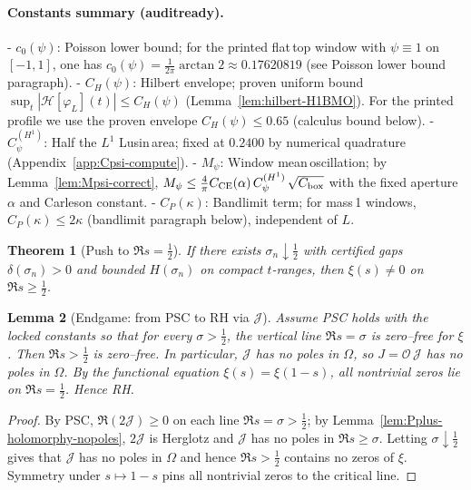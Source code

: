 \documentclass[11pt]{article}
\newtheorem{theorem}{Theorem}
\newtheorem{lemma}[theorem]{Lemma}
\theoremstyle{definition}
\theoremstyle{remark}
\newcommand{\R}{\mathbb{R}}
\begin{document}
\paragraph{Constants summary (audit\textendash ready).}
- \textbf{$c_0(\psi)$}: Poisson lower bound; for the printed flat\,top window with $\psi\equiv 1$ on $[-1,1]$, one has $c_0(\psi)=\tfrac{1}{2\pi}\arctan 2\approx 0.17620819$ (see Poisson lower bound paragraph).
- \textbf{$C_H(\psi)$}: Hilbert envelope; proven uniform bound $\sup_t|\mathcal H[\varphi_L](t)|\le C_H(\psi)$ (Lemma~\ref{lem:hilbert-H1BMO}). For the printed profile we use the proven envelope $C_H(\psi)\le 0.65$ (calculus bound below).
- \textbf{$C_\psi^{(H^1)}$}: Half the $L^1$ Lusin\,area; fixed at $0.2400$ by numerical quadrature (Appendix~\ref{app:Cpsi-compute}).
- \textbf{$M_\psi$}: Window mean\,oscillation; by Lemma~\ref{lem:Mpsi-correct},
\(M_\psi\le \tfrac{4}{\pi}C_{\mathrm{CE}}(\alpha)\,C_\psi^{(H^1)}\,\sqrt{C_{\rm box}}\) with the fixed aperture $\alpha$ and Carleson constant.
- \textbf{$C_P(\kappa)$}: Bandlimit term; for mass\,1 windows, $C_P(\kappa)\le 2\kappa$ (bandlimit paragraph below), independent of $L$.

\iffalse %
\subsection*{Zero-free verticals and boundary push}
\begin{theorem}[Zero-free vertical lines]\label{thm:lines}
If the covering certifies $\Re s=\sigma$ with gap $\delta(\sigma)>0$, then $\xi(\sigma+it)\ne 0$ for all $t\in\R$.
\end{theorem}
\fi

\begin{theorem}[Push to $\Re s=\tfrac12$]\label{thm:boundary}
If there exists $\sigma_n\downarrow\tfrac12$ with certified gaps $\delta(\sigma_n)>0$ and bounded $H(\sigma_n)$ on compact $t$-ranges, then $\xi(s)\ne 0$ on $\Re s\ge\tfrac12$.
\end{theorem}

\begin{lemma}[Endgame: from PSC to RH via $\mathcal J$]\label{lem:endgame}
Assume PSC holds with the locked constants so that for every $\sigma> \tfrac12$, the vertical line $\Re s=\sigma$ is zero–free for $\xi$. Then $\Re s>\tfrac12$ is zero–free. In particular, $\mathcal J$ has no poles in $\Omega$, so $J=\mathcal O\,\mathcal J$ has no poles in $\Omega$. By the functional equation $\xi(s)=\xi(1-s)$, all nontrivial zeros lie on $\Re s=\tfrac12$. Hence RH.
\end{lemma}
\begin{proof}
By PSC, $\Re(2\mathcal J)\ge0$ on each line $\Re s=\sigma>\tfrac12$; by Lemma~\ref{lem:Pplus-holomorphy-nopoles}, $2\mathcal J$ is Herglotz and $\mathcal J$ has no poles in $\Re s\ge\sigma$. Letting $\sigma\downarrow\tfrac12$ gives that $\mathcal J$ has no poles in $\Omega$ and hence $\Re s>\tfrac12$ contains no zeros of $\xi$. Symmetry under $s\mapsto 1-s$ pins all nontrivial zeros to the critical line.
\end{proof}
\end{document}

